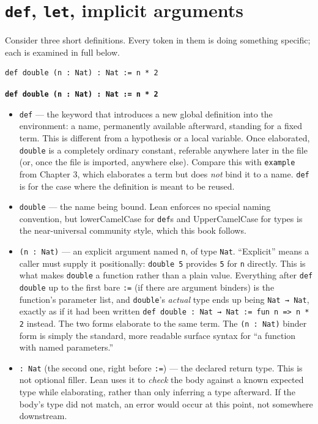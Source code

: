 \section{\texorpdfstring{\texttt{def}, \texttt{let}, implicit arguments}{def, let, implicit arguments}}\label{sec:01-basics:02-def-let-implicit:1}

Consider three short definitions. Every token in them is doing something specific; each is examined in full below.

\begin{lstlisting}
def double (n : Nat) : Nat := n * 2
\end{lstlisting}

\textbf{\texttt{def double (n : Nat) : Nat := n * 2}}

\begin{itemize}
\tightlist
\item
  \texttt{def} --- the keyword that introduces a new global definition into the environment: a name, permanently available afterward, standing for a fixed term. This is different from a hypothesis or a local variable. Once elaborated, \texttt{double} is a completely ordinary constant, referable anywhere later in the file (or, once the file is imported, anywhere else). Compare this with \texttt{example} from Chapter 3, which elaborates a term but does \emph{not} bind it to a name. \texttt{def} is for the case where the definition is meant to be reused.
\item
  \texttt{double} --- the name being bound. Lean enforces no special naming convention, but lowerCamelCase for \texttt{def}s and UpperCamelCase for types is the near-universal community style, which this book follows.
\item
  \texttt{(n : Nat)} --- an explicit argument named \texttt{n}, of type \texttt{Nat}. ``Explicit'' means a caller must supply it positionally: \texttt{double 5} provides \texttt{5} for \texttt{n} directly. This is what makes \texttt{double} a function rather than a plain value. Everything after \texttt{def double} up to the first bare \texttt{:=} (if there are argument binders) is the function's parameter list, and \texttt{double}'s \emph{actual} type ends up being \texttt{Nat → Nat}, exactly as if it had been written \texttt{def double : Nat → Nat := fun n => n * 2} instead. The two forms elaborate to the same term. The \texttt{(n : Nat)} binder form is simply the standard, more readable surface syntax for ``a function with named parameters.''
\item
  \texttt{: Nat} (the second one, right before \texttt{:=}) --- the declared return type. This is not optional filler. Lean uses it to \emph{check} the body against a known expected type while elaborating, rather than only inferring a type afterward. If the body's type did not match, an error would occur at this point, not somewhere downstream.

\end{itemize}
